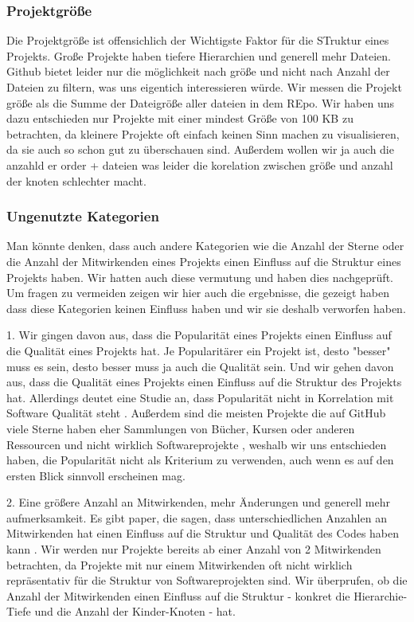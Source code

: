 \subsubsection*{Projektgröße} Die Projektgröße ist offensichlich der Wichtigste Faktor für die STruktur eines Projekts. Große Projekte haben tiefere Hierarchien und generell mehr Dateien. Github bietet leider nur die möglichkeit nach größe und nicht nach Anzahl der Dateien zu filtern, was uns eigentich interessieren würde. Wir messen die Projekt größe als die Summe der Dateigröße aller dateien in dem REpo. Wir haben uns dazu entschieden nur Projekte mit einer mindest Größe von 100 KB zu betrachten, da kleinere Projekte oft einfach keinen Sinn machen zu visualisieren, da sie auch so schon gut zu überschauen sind. Außerdem wollen wir ja auch die anzahld er order + dateien was leider die korelation zwischen größe und anzahl der knoten schlechter macht. 

\subsubsection*{Ungenutzte Kategorien}
Man könnte denken, dass auch andere Kategorien wie die Anzahl der Sterne oder die Anzahl der Mitwirkenden eines Projekts einen Einfluss auf die Struktur eines Projekts haben. Wir hatten auch diese vermutung und haben dies nachgeprüft. Um fragen zu vermeiden zeigen wir hier auch die ergebnisse, die gezeigt haben dass diese Kategorien keinen Einfluss haben und wir sie deshalb verworfen haben.

1. Wir gingen davon aus, dass die Popularität eines Projekts einen Einfluss auf die Qualität eines Projekts hat. Je Popularitärer ein Projekt ist, desto "besser" muss es sein, desto besser muss ja auch die Qualität sein. Und wir gehen davon aus, dass die Qualität eines Projekts einen Einfluss auf die Struktur des Projekts hat. Allerdings deutet eine Studie an, dass Popularität nicht in Korrelation mit Software Qualität steht \cite{popAndQuality}. Außerdem sind die meisten Projekte die auf GitHub viele Sterne haben eher Sammlungen von Bücher, Kursen oder anderen Ressourcen und nicht wirklich Softwareprojekte \cite{evanli_github-ranking_2025}, weshalb wir uns entschieden haben, die Popularität nicht als Kriterium zu verwenden, auch wenn es auf den ersten Blick sinnvoll erscheinen mag.

2. Eine größere Anzahl an Mitwirkenden, mehr Änderungen und generell mehr aufmerksamkeit. 
Es gibt paper, die sagen, dass unterschiedlichen Anzahlen an Mitwirkenden hat einen Einfluss auf die Struktur und Qualität des Codes haben kann \cite{numDevs}. Wir werden nur Projekte bereits ab einer Anzahl von 2 Mitwirkenden betrachten, da Projekte mit nur einem Mitwirkenden oft nicht wirklich repräsentativ für die Struktur von Softwareprojekten sind. 
Wir überprufen, ob die Anzahl der Mitwirkenden einen Einfluss auf die Struktur - konkret die Hierarchie-Tiefe und die Anzahl der Kinder-Knoten - hat.

